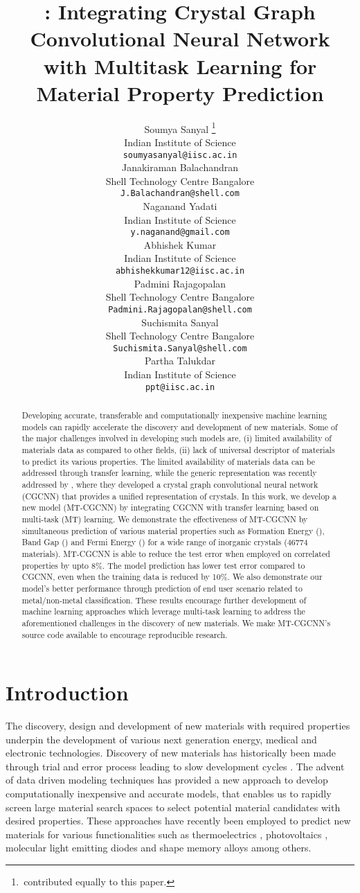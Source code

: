 \documentclass{article}
\title{\method{}: Integrating Crystal Graph Convolutional Neural Network with Multitask Learning for Material Property Prediction}
\author{
  Soumya Sanyal \thanks{ \,contributed equally to this paper.}\\
  Indian Institute of Science\\
  \texttt{soumyasanyal@iisc.ac.in} \\
  \And
  Janakiraman Balachandran \footnotemark[1]\\
  Shell Technology Centre Bangalore \\
  \texttt{J.Balachandran@shell.com} \\
  \And
  Naganand Yadati \\
  Indian Institute of Science \\
  \texttt{y.naganand@gmail.com} \\
  \And
  Abhishek Kumar \\
  Indian Institute of Science  \\
  \texttt{abhishekkumar12@iisc.ac.in} \\
  \And
  Padmini Rajagopalan \\
  Shell Technology Centre Bangalore \\
  \texttt{Padmini.Rajagopalan@shell.com} \\
  \And
  Suchismita Sanyal \\
  Shell Technology Centre Bangalore \\
  \texttt{Suchismita.Sanyal@shell.com} \\
  \And
  Partha Talukdar \\
  Indian Institute of Science \\
  \texttt{ppt@iisc.ac.in} \\
}
\newcommand{\method}[1]{MT-CGCNN}
\newcommand{\baseline}[1]{CGCNN}
\newcommand{\propone}[1]{Formation Energy}
\newcommand{\proponesym}[1]{}
\newcommand{\proptwo}[1]{Band Gap}
\newcommand{\proptwosym}[1]{}
\newcommand{\propthree}[1]{Fermi Energy}
\newcommand{\propthreesym}[1]{}
\begin{document}
\maketitle

\begin{abstract}
  Developing accurate, transferable and computationally inexpensive machine learning models can rapidly accelerate the discovery and development of new materials. Some of the major challenges involved in developing such models are, (i) limited availability of materials data as compared to other fields, (ii) lack of universal descriptor of materials to predict its various properties. The limited availability of materials data can be addressed through transfer learning, while the generic representation was recently addressed by \citet{CGCNN}, where they developed a crystal graph convolutional neural network (\baseline{}) that provides a unified representation of crystals. In this work, we develop a new model (\method{}) by integrating \baseline{}  with transfer learning based on multi-task (MT) learning. We demonstrate the effectiveness of \method{} by simultaneous prediction of various material properties such as  \propone{} (\proponesym{}), \proptwo{} (\proptwosym{}) and \propthree{} (\propthreesym{}) for a wide range of inorganic crystals (46774 materials). \method{} is able to reduce the test error when employed on correlated properties by upto 8\%. The model prediction has lower test error compared to \baseline{}, even when the training data is reduced by 10\%. We also demonstrate our model's better performance through prediction of end user scenario related to metal/non-metal classification. These results encourage further development of machine learning approaches which leverage multi-task learning to address the aforementioned challenges in the discovery of new materials. We make \method{}’s source code available to encourage reproducible research.
\end{abstract}

\section{Introduction}
The discovery, design and development of new materials with required properties underpin the development of various next generation energy, medical and electronic technologies. Discovery of new materials has historically been made through trial and error process leading to slow development cycles \cite{TomKalilMaterialsGenomeInitiative}. The advent of data driven modeling techniques has provided a new approach to develop computationally inexpensive and accurate models, that enables us to rapidly screen large material search spaces to select potential material candidates with desired properties. These approaches have recently been employed to predict new materials for various functionalities such as thermoelectrics \cite{GaultoisPerspectiveWebbasedmachine2016}, photovoltaics \cite{LuAccelerateddiscoverystable2018}, molecular light emitting diodes\cite{Gomez-BombarelliDesignefficientmolecular2016} and shape memory alloys \cite{XueAcceleratedsearchmaterials2016} among others.
\end{document}
